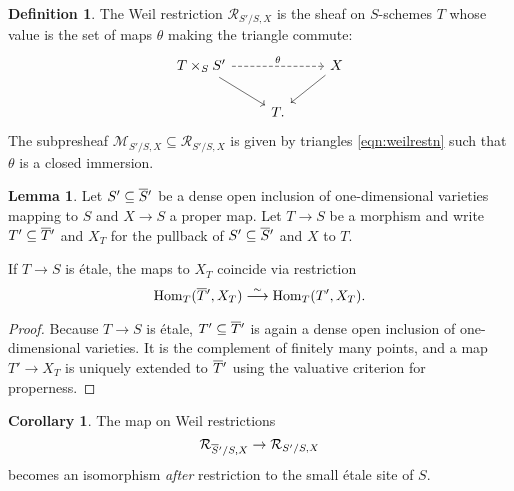 \documentclass[11pt,reqno]{amsart}
\theoremstyle{definition}
\newtheorem{lemma}[theorem]{Lemma}
\newtheorem{corollary}[theorem]{Corollary}
\newtheorem{definition}[theorem]{Definition}
\newcommand{\Hom}{{\rm Hom}}
\def\overnorm#1{\overline{#1}\vphantom{#1}}
\renewcommand{\bar}[1]{\ensuremath{\overnorm{#1}}}
\newcommand{\WR}{\cal R}
\newcommand{\Gen}{\cal M}
\newcommand{\cal}[1]{\ensuremath{\mathcal{#1}}}
\newcommand{\longsimeq}{\overset{\sim}{\longrightarrow}}
\begin{document}
\begin{definition}
	
	The Weil restriction $\WR_{S'/S, X}$ is the sheaf on $S$-schemes $T$ whose value is the set of maps $\theta$ making the triangle commute:
	\begin{equation}\label{eqn:weilrestn}
		\begin{tikzcd}
			T \times_S S' \ar[rr, dashed, "\theta"] \ar[dr] 		&		&X \ar[dl] 		\\
			&T.
		\end{tikzcd}
	\end{equation}
	The subpresheaf $\Gen_{S'/S, X} \subseteq \WR_{S'/S, X}$ is given by triangles \eqref{eqn:weilrestn} such that $\theta$ is a closed immersion. 
	
\end{definition}






\begin{lemma}

Let $S' \subseteq \bar S'$ be a dense open inclusion of one-dimensional varieties mapping to $S$ and $X \to S$ a proper map. Let $T \to S$ be a morphism and write $T' \subseteq \bar T'$ and $X_T$ for the pullback of $S' \subseteq \bar S'$ and $X$ to $T$. 

If $T \to S$ is \'etale, the maps to $X_T$ coincide via restriction
\[\Hom_T(\bar T', X_T) \longsimeq \Hom_T(T', X_T).\]

\end{lemma}

\begin{proof}

Because $T \to S$ is \'etale, $T' \subseteq \bar T'$ is again a dense open inclusion of one-dimensional varieties. It is the complement of finitely many points, and a map $T' \to X_T$ is uniquely extended to $\bar T'$ using the valuative criterion for properness. 


\end{proof}


\begin{corollary}

The map on Weil restrictions
\begin{equation}\label{eqn:weilrestnrestn}
	\WR_{\bar S'/S, X} \to \WR_{S'/S, X}
\end{equation}
becomes an isomorphism \emph{after} restriction to the small \'etale site of $S$. 

\end{corollary}
\end{document}
